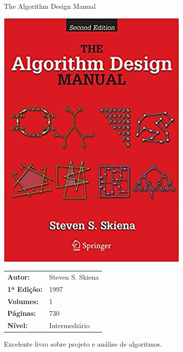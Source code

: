 \begin{frame}[fragile]{The Algorithm Design Manual}

    \begin{minipage}{0.4\textwidth}
        \includegraphics[scale=0.25]{skiena.jpg}
    \end{minipage}
    \begin{minipage}{0.5\textwidth}
        \begin{small}
            \begin{tabularx}{0.95\textwidth}{lX}
                \textbf{Autor:} & Steven S. Skiena \\
                \textbf{1ª Edição:} & 1997 \\
                \textbf{Volumes:} & 1 \\
                \textbf{Páginas:} & 730 \\
                \textbf{Nível:} & Intermediário \\
            \end{tabularx}
        \end{small}
    \end{minipage}

    \vspace{0.2in} 

    Excelente livro sobre projeto e análise de algoritmos.

\end{frame}

